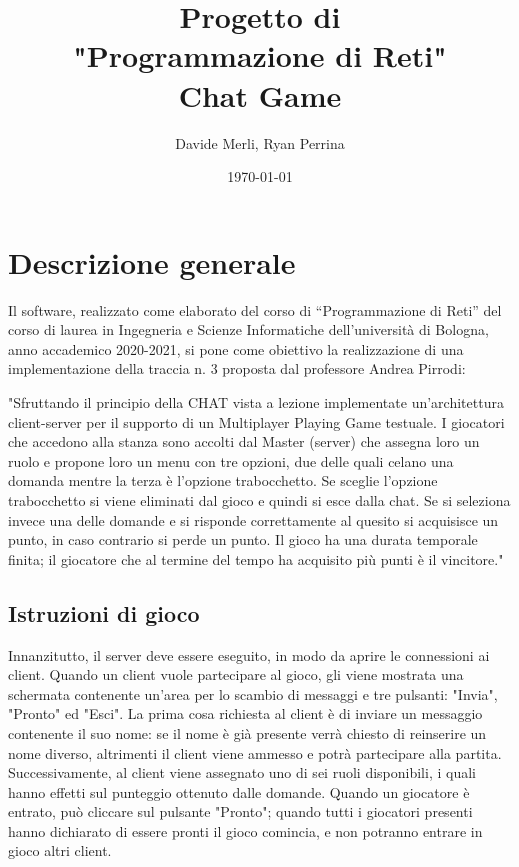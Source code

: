 \documentclass[a4paper,12pt]{report}
\title{Progetto di \\"Programmazione di Reti"\\Chat Game}
\author{Davide Merli, Ryan Perrina }
\date{\today}
\begin{document}
\maketitle
\tableofcontents


\chapter{Descrizione generale}

Il software, realizzato come elaborato del corso di “Programmazione di Reti” del corso di
laurea in Ingegneria e Scienze Informatiche dell’università di Bologna, anno accademico 2020-2021,
si pone come obiettivo la realizzazione di una implementazione della traccia n. 3 proposta dal
professore Andrea Pirrodi:

"Sfruttando il principio della CHAT vista a lezione implementate un’architettura
client-server per il supporto di un Multiplayer Playing Game testuale.
I giocatori che accedono alla stanza sono accolti dal Master (server) che assegna
loro un ruolo e propone loro un menu con tre opzioni, due delle quali
celano una domanda mentre la terza è l’opzione trabocchetto. Se sceglie
l’opzione trabocchetto si viene eliminati dal gioco e quindi si esce dalla chat.
Se si seleziona invece una delle domande e  si risponde correttamente al quesito si
acquisisce un punto, in caso contrario si perde un punto.
Il gioco ha una durata temporale finita; il giocatore che al termine del tempo
ha acquisito più punti è il vincitore."

\section{Istruzioni di gioco}
Innanzitutto, il server deve essere eseguito, in modo da aprire le connessioni ai client.
Quando un client vuole partecipare al gioco, gli viene mostrata una schermata contenente
un'area per lo scambio di messaggi e tre pulsanti: "Invia", "Pronto" ed "Esci".
La prima cosa richiesta al client è di inviare un messaggio contenente il suo nome: se il nome
è già presente verrà chiesto di reinserire un nome diverso, altrimenti il client viene ammesso
e potrà partecipare alla partita.
Successivamente, al client viene assegnato uno di sei ruoli disponibili, i quali hanno effetti sul
punteggio ottenuto dalle domande.
Quando un giocatore è entrato, può cliccare sul pulsante "Pronto"; quando tutti i giocatori presenti
hanno dichiarato di essere pronti il gioco comincia, e non potranno entrare in gioco altri client.
\end{document}
